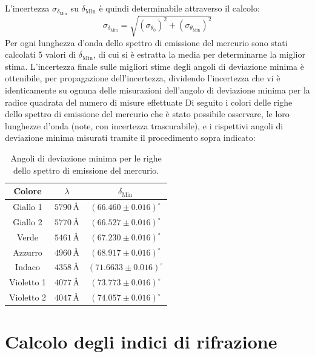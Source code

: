 \documentclass[a4paper,12pt]{article}
\begin{document}
L’incertezza \( \sigma_{\delta_{\text{Min}}} \) su \( \delta_{\text{Min}} \) è quindi determinabile attraverso il calcolo:
\[
\sigma_{\delta_{\text{Min}}} = \sqrt{(\sigma_{\theta_0})^2 + (\sigma_{\theta_{\text{Min}}})^2}
\]
Per ogni lunghezza d’onda dello spettro di emissione del mercurio sono stati calcolati 5 valori di \( \delta_{\text{Min}} \), di cui si è estratta la media per determinarne la miglior stima. L'incertezza finale sulle migliori stime degli angoli di deviazione minima è ottenibile, per propagazione dell'incertezza, dividendo l'incertezza che vi è identicamente su ognuna delle misurazioni dell'angolo di deviazione minima per la radice quadrata del numero di misure effettuate
Di seguito i colori delle righe dello spettro di emissione del mercurio che è stato possibile osservare, le loro lunghezze d’onda (note, con incertezza trascurabile), e i rispettivi angoli di deviazione minima misurati tramite il procedimento sopra indicato:

\begin{table}[H]
    \centering
    \begin{tabular}{ccc}
    \hline
    \textbf{Colore} & \textbf{\( \lambda \)} & \textbf{\( \delta_{\text{Min}} \)} \\ \hline
    Giallo 1 & \( 5790 \, \text{\AA} \) & \( (66.460 \pm 0.016)^\circ \) \\ 
    Giallo 2 & \( 5770 \, \text{\AA} \) & \( (66.527 \pm 0.016)^\circ \) \\ 
    Verde & \( 5461 \, \text{\AA} \) & \( (67.230 \pm 0.016)^\circ \) \\ 
    Azzurro & \( 4960 \, \text{\AA} \) & \( (68.917 \pm 0.016)^\circ \) \\ 
    Indaco & \( 4358 \, \text{\AA} \) & \( (71.6633 \pm 0.016)^\circ \) \\ 
    Violetto 1 & \( 4077 \, \text{\AA} \) & \( (73.773 \pm 0.016)^\circ \) \\ 
    Violetto 2 & \( 4047 \, \text{\AA} \) & \( (74.057 \pm 0.016)^\circ \) \\ \hline
    \end{tabular}
    \caption{Angoli di deviazione minima per le righe dello spettro di emissione del mercurio.}
    \label{tab:angoli_deviazione_minima}
\end{table}
    
\section{Calcolo degli indici di rifrazione}
\end{document}
